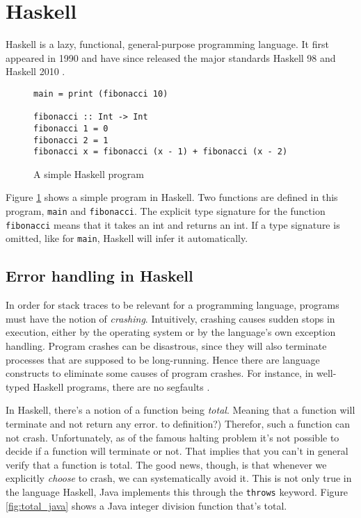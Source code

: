\section{Haskell}

Haskell is a lazy, functional, general-purpose programming language.
\cite{haskell_report2010}
It first appeared in 1990 \cite{HistoryOfHaskell2007}  and have since
released the major standards Haskell 98 and Haskell 2010
\cite{haskell_report2010}.

\begin{figure}
\begin{mdframed}
  \begin{verbatim}
main = print (fibonacci 10)

fibonacci :: Int -> Int
fibonacci 1 = 0
fibonacci 2 = 1
fibonacci x = fibonacci (x - 1) + fibonacci (x - 2)
  \end{verbatim}
  \caption{A simple Haskell program}
  \label{fig:simple_program}
\end{mdframed}
\end{figure}

Figure \ref{fig:simple_program} shows a simple program in Haskell.
Two functions are defined in this program, \texttt{main} and
\texttt{fibonacci}.  The explicit type signature for the function
\texttt{fibonacci} means that it takes an int and returns an int. If a type
signature is omitted, like for \texttt{main}, Haskell will infer it automatically.

\subsection{Error handling in Haskell}

In order for stack traces to be relevant for a programming language, programs
must have the notion of \emph{crashing}. Intuitively, crashing causes sudden
stops in execution, either by the operating system or by the language's own
exception handling. Program crashes can be disastrous, since they will also
terminate processes that are supposed to be long-running. Hence there are
language constructs to eliminate some causes of program crashes.
For instance,
in well-typed Haskell programs, there are no segfaults \cite{FindingTheNeedle2009}.

In Haskell, there's a notion of a function being \emph{total}. Meaning
that a function will terminate and not return any error. %
to definition?) Therefor, such a function can not crash. Unfortunately,
as of the famous halting problem it's not possible to decide if a
function will terminate or not. That implies that you can't in general
verify that a function is total. %
The good news, though, is that whenever we
explicitly \emph{choose} to crash, we can systematically avoid it. This is not
only true in the language Haskell, Java implements this through the
\texttt{throws} keyword. %
Figure \ref{fig:total_java} shows a Java integer division function that's
total.

